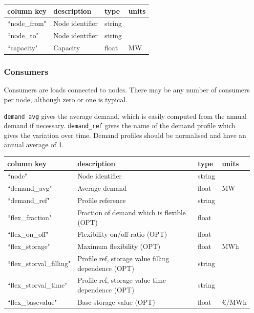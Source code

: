\documentclass{article}
\begin{document}
\medskip
\begin{tabular}{llll}
	\hline
	column key & description & type & units \\
	\hline
	``node\_from"	&	Node identifier 	& string	& \\
	``node\_to"		&	Node identifier	& string	& \\
	``capacity"		&	Capacity & float		& MW \\
	\hline
\end{tabular}


\subsubsection{Consumers}
Consumers are loads connected to nodes. There may be any number of consumers per node, although zero or one is typical.

\texttt{demand\_avg} gives the average demand, which is easily computed from the annual demand if necessary.
\texttt{demand\_ref} gives the name of the demand profile which gives the variation over time. Demand profiles should be normalised and have an annual average of 1.

\medskip
\begin{tabular}{llll}
	\hline
	column key & description & type & units \\
	\hline
	``node"			& Node identifier 	& string		& \\
	``demand\_avg"		& Average demand	& float		& MW \\
	``demand\_ref"		& Profile reference	& string	&  \\
	``flex\_fraction"		& Fraction of demand which is flexible (OPT) 	& float	& \\
	``flex\_on\_off"		& Flexibility on/off ratio (OPT)		& float		&  \\
	``flex\_storage"				& Maximum flexibility (OPT)	& float		& MWh \\
	``flex\_storval\_filling"& Profile ref, storage value filling dependence (OPT)	& string	&  \\
	``flex\_storval\_time"& Profile ref, storage value time dependence (OPT)	& string	&  \\
	``flex\_basevalue"			& Base storage value (OPT)	& float	& €/MWh \\
	\hline
\end{tabular}
\end{document}
